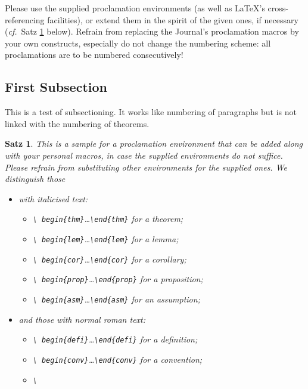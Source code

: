\documentclass{CSLM} %
\theoremstyle{plain}\newtheorem{satz}[thm]{Satz} %
\def\cf{{\em cf.}}
\begin{document}
  Please use the supplied proclamation environments (as well as
  LaTeX's cross-referencing facilities), or extend them in the spirit
  of the given ones, if necessary (\cf~Satz \ref{T:big} below).
  Refrain from replacing the Journal's proclamation macros by your own
  constructs, especially do not change the numbering scheme: all
  proclamations are to be numbered consecutively!

\subsection{First Subsection}

  This is a test of subsectioning.  It works like numbering of
  paragraphs but is not linked with the numbering of theorems.

\begin{satz}\label{T:big}
  This is a sample for a proclamation environment that can be added
  along with your personal macros, \emph{in case the supplied
    environments do not suffice}.  Please refrain from substituting
  other environments for the supplied ones.  We distinguish those 
\begin{itemize}
\item with italicised text:
\begin{itemize}
\item\emph{\texttt{\textbackslash
    begin\{thm\}}\dots\texttt{\textbackslash end\{thm\}}} for a theorem;
\item\emph{\texttt{\textbackslash
    begin\{lem\}}\dots\texttt{\textbackslash end\{lem\}}} for a lemma;
\item\emph{\texttt{\textbackslash
    begin\{cor\}}\dots\texttt{\textbackslash end\{cor\}}} for a corollary;
\item\emph{\texttt{\textbackslash
    begin\{prop\}}\dots\texttt{\textbackslash end\{prop\}}} for a proposition;
\item\emph{\texttt{\textbackslash
    begin\{asm\}}\dots\texttt{\textbackslash end\{asm\}}} for an
  assumption;
\end{itemize}
\item  and those with normal roman text:
\begin{itemize}
\item\emph{\texttt{\textbackslash
    begin\{defi\}}\dots\texttt{\textbackslash end\{defi\}}} for a definition;
\item\emph{\texttt{\textbackslash
    begin\{conv\}}\dots\texttt{\textbackslash end\{conv\}}} for a convention;
\item\emph{\texttt{\textbackslash
}}
\end{itemize}
\end{itemize}
\end{satz}
\end{document}
